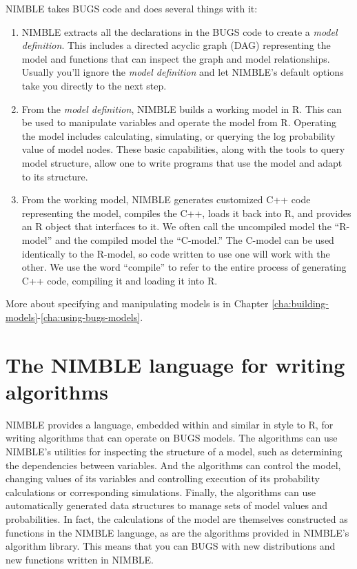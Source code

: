 \documentclass[12pt,oneside]{book}\usepackage[]{graphicx}\usepackage[]{color}
\def\nm#1{\textit{#1}}
\begin{document}
  NIMBLE takes BUGS code and does several things with it:
  \begin{enumerate}
  \item NIMBLE extracts all the declarations in the BUGS code to
    create a \nm{model definition}.  This includes a directed acyclic graph (DAG)
    representing the model and functions that can 
    inspect the graph and model relationships.  Usually you'll ignore the \nm{model definition}
    and let NIMBLE's default options take you directly to the next step.
  \item From the \nm{model definition}, NIMBLE builds a working model
    in R.  This can be used to manipulate variables and operate the
    model from R.  Operating the model includes calculating,
    simulating, or querying the log probability value of model
    nodes. These basic capabilities, along with the tools to query model
    structure, allow one to write programs that use the model and
    adapt to its structure.
  \item From the working model, NIMBLE generates customized C++ code
    representing the model, compiles the C++, loads it back into R,
    and provides an R object that interfaces to it.  We often call the
    uncompiled model the ``R-model'' and the compiled model the
    ``C-model.''  The C-model can be used identically to the R-model,
    so code written to use one will work with the other.  We use the
    word ``compile'' to refer to
    the entire process of generating C++ code, compiling it and
    loading it into R.
  \end{enumerate}
 
  More about specifying and manipulating models is in Chapter \ref{cha:building-models}-\ref{cha:using-bugs-models}.
  
  
  \section{The NIMBLE language for writing algorithms}
  \label{sec:nimble-lang-writ}
  
  NIMBLE provides a language, embedded within and similar in style to
  R, for writing algorithms that can operate on BUGS models.  The
  algorithms can use NIMBLE's utilities for inspecting the structure
  of a model, such as determining the dependencies between variables.
  And the algorithms can control the model, changing values of its
  variables and controlling execution of its probability calculations
  or corresponding simulations.  Finally, the algorithms can use
  automatically generated data structures to manage sets of model
  values and probabilities.  In fact, the calculations of the model
  are themselves constructed as functions in the NIMBLE language, as
  are the algorithms provided in NIMBLE's algorithm library.  This
  means that you can BUGS with new
  distributions and new functions written in NIMBLE.
  
\end{document}
